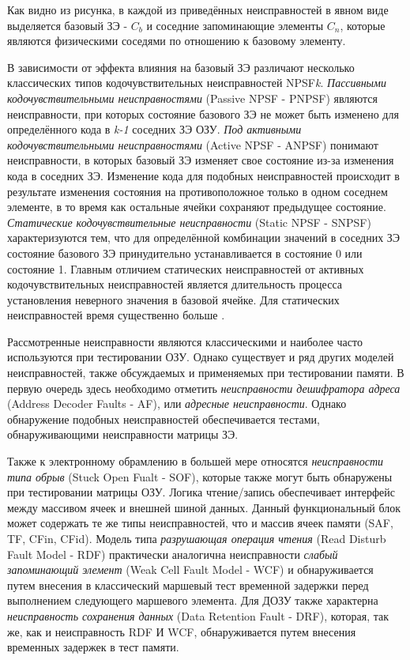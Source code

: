 Как видно из рисунка, в каждой из приведённых неисправностей в явном виде выделяется базовый ЗЭ - $C_b$ и соседние запоминающие элементы $C_n$, которые являются физическими соседями по отношению к базовому элементу.

В зависимости от эффекта влияния на базовый ЗЭ различают несколько классических типов кодочувствительных неисправностей NPSF\textit{k}.
\textit{Пассивными кодочувствительными неисправностями} (Passive NPSF - PNPSF) являются неисправности, при которых состояние базового ЗЭ не может быть изменено для определённого кода в \textit{k-1} соседних ЗЭ ОЗУ. 
\textit{Под активными кодочувствительными неисправностями} (Active NPSF - ANPSF) понимают неисправности, в которых базовый ЗЭ изменяет свое состояние из-за изменения кода в соседних ЗЭ. Изменение кода для подобных неисправностей происходит в результате изменения состояния на противоположное только в одном соседнем элементе, в то время как остальные ячейки сохраняют предыдущее состояние.
\textit{Статические кодочувствительные неисправности} (Static NPSF - SNPSF) характеризуются тем, что для определённой комбинации значений в соседних ЗЭ состояние базового ЗЭ принудительно устанавливается в состояние 0 или состояние 1. Главным отличием статических неисправностей от активных кодочувствительных неисправностей является длительность процесса установления неверного значения в базовой ячейке. Для статических неисправностей время существенно больше \cite{faults}.

Рассмотренные неисправности являются классическими и наиболее часто используются при тестировании ОЗУ. Однако существует и ряд других моделей неисправностей, также обсуждаемых и применяемых при тестировании памяти. В первую очередь здесь необходимо отметить \textit{неисправности дешифратора адреса} (Address Decoder Faults - AF), или \textit{адресные неисправности}. Однако обнаружение подобных неисправностей обеспечивается тестами, обнаруживающими неисправности матрицы ЗЭ.

Также к электронному обрамлению в большей мере относятся \textit{неисправности типа обрыв} (Stuck Open Fualt - SOF), которые также могут быть обнаружены при тестировании матрицы ОЗУ.
Логика чтение/запись обеспечивает интерфейс между массивом ячеек и внешней шиной данных. Данный функциональный блок может содержать те же типы неисправностей, что и массив ячеек памяти (SAF, TF, CFin, CFid). 
Модель типа \textit{разрушающая операция чтения} (Read Disturb Fault Model - RDF) практически аналогична неисправности \textit{слабый запоминающий элемент} (Weak Cell Fault Model - WCF) и обнаруживается путем внесения в классический маршевый тест временной задержки перед выполнением следующего маршевого элемента. Для ДОЗУ также характерна \textit{неисправность сохранения данных} (Data Retention Fault - DRF), которая, так же, как и неисправность RDF И WCF, обнаруживается путем внесения временных задержек в тест памяти.  


